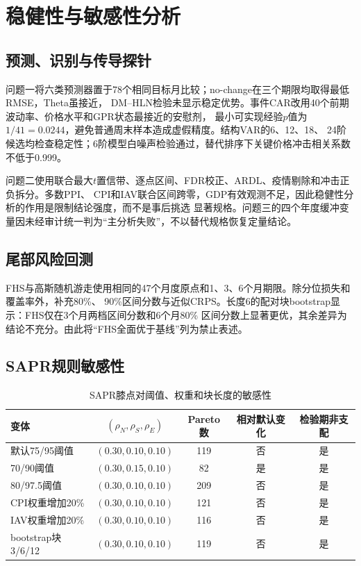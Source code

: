 \section{稳健性与敏感性分析}

\subsection{预测、识别与传导探针}

问题一将六类预测器置于78个相同目标月比较；no-change在三个期限均取得最低RMSE，Theta虽接近，
DM--HLN检验未显示稳定优势。事件CAR改用40个前期波动率、价格水平和GPR状态最接近的安慰剂，
最小可实现经验$p$值为$1/41=0.0244$，避免普通周末样本造成虚假精度。结构VAR的6、12、18、
24阶候选均检查稳定性；6阶模型白噪声检验通过，替代排序下关键价格冲击相关系数不低于0.999。

问题二使用联合最大$t$置信带、逐点区间、FDR校正、ARDL、疫情剔除和冲击正负拆分。多数PPI、
CPI和IAV联合区间跨零，GDP有效观测不足，因此稳健性分析的作用是限制结论强度，而不是事后挑选
显著规格。问题三的四个年度缓冲变量因未经审计统一判为“主分析失败”，不以替代规格恢复定量结论。

\subsection{尾部风险回测}

FHS与高斯随机游走使用相同的47个月度原点和1、3、6个月期限。除分位损失和覆盖率外，补充80\%、
90\%区间分数与近似CRPS\cite{gneiting2007}。长度6的配对块bootstrap显示：FHS仅在3个月两档区间分数和6个月80\%
区间分数上显著更优，其余差异为结论不充分。由此将“FHS全面优于基线”列为禁止表述。

\subsection{SAPR规则敏感性}

\begin{table}[htbp]
  \centering
  \small
  \caption{SAPR膝点对阈值、权重和块长度的敏感性}
  \label{tab:q4-sensitivity}
  \begin{tabular}{lcccc}
    \toprule
    变体 & $(\rho_N,\rho_S,\rho_E)$ & Pareto数 & 相对默认变化 & 检验期非支配 \\
    \midrule
    默认75/95阈值 & $(0.30,0.10,0.10)$ & 119 & 否 & 是 \\
    70/90阈值 & $(0.30,0.15,0.10)$ & 82 & 是 & 是 \\
    80/97.5阈值 & $(0.30,0.10,0.10)$ & 209 & 否 & 是 \\
    CPI权重增加20\% & $(0.30,0.10,0.10)$ & 121 & 否 & 是 \\
    IAV权重增加20\% & $(0.30,0.10,0.10)$ & 116 & 否 & 是 \\
    bootstrap块3/6/12 & $(0.30,0.10,0.10)$ & 119 & 否 & 是 \\
    \bottomrule
  \end{tabular}
\end{table}

